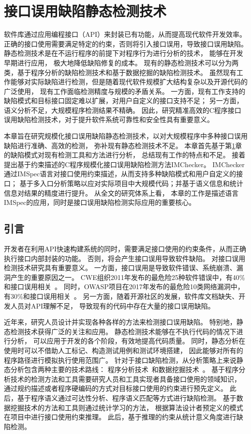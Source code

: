 \chapter{接口误用缺陷静态检测技术}
\label{cha:imchecker}
软件库通过应用编程接口（API）来封装已有功能，从而提高现代软件开发效率。
正确的接口使用需要满足特定的约束，否则将引入接口误用，导致接口误用缺陷。
静态检测技术是在不运行程序的前提下对程序行为进行分析的技术，
能够在开发早期进行应用，
极大地降低缺陷修复的成本。
现有的静态检测技术可以分为两类，基于程序分析的缺陷检测技术和基于数据挖掘的缺陷检测技术。
虽然现有工作能够对实际缺陷进行检测，但是随着现代软件规模扩大结构复杂以及开源代码的广泛使用，
现有工作面临检测精度与规模的矛盾关系。
一方面，现有工作支持的缺陷模式和目标接口固定难以扩展，对用户自定义的接口支持不足；
另一方面，语义分析不足，大规模程序检测结果不精确。
因此，研究精准高效的C程序接口误用缺陷检测技术，对于提升软件系统可靠性和安全性具有重要意义。

本章旨在研究规模化接口误用缺陷静态检测技术，以对大规模程序中多种接口误用缺陷进行准确、高效的检测，
弥补现有静态检测技术不足。
本章首先基于第\ref{cha:imchecker}章的缺陷模式对现有检测工具和方法进行分析，
总结现有工作的特点和不足。
接着提出基于约束描述的C程序规模化接口误用缺陷检测方法IMChecker。
IMChecker通过IMSpec语言对接口使用约束描述，从而支持多种缺陷模式和用户自定义的接口；
基于多入口分析策略以应对实际项目中大规模代码；并基于语义信息和统计信息对结果的精度进行提升。
从全文的研究体系上看，
本章的工作是描述语言IMSpec的应用，同时是接口误用缺陷检测实际应用的重要核心。

\section{引言}
开发者在利用API快速构建系统的同时，需要满足接口使用的约束条件，从而正确执行接口内部封装的功能。
否则，将会产生接口误用导致软件缺陷。
对接口误用检测技术研究具有重要意义。
一方面，接口误用是导致软件错误、系统崩溃、漏洞产生的重要原因之一。
CWE组织2011年发布的最危险25种软件错误中，有40\%和接口误用相关~\cite{cwe-top25}。
同时，OWASP项目在2017年发布的最危险10类网络漏洞中，有30\%和接口误用相关~\cite{owasp-top10}。
另一方面，随着开源社区的发展，软件库文档缺失、开发人员对API理解不足，
导致现有的代码中存在大量的接口误用缺陷。

近年来，研究人员设计并实现各种各样的方法来检测接口误用缺陷。
特别地，静态检测技术获得广泛的关注和应用。
静态检测技术能够在不执行代码的情况下进行分析，
可以应用于开发的各个阶段，有效地提高代码质量。
同时，静态分析在使用时可以不借助人工标记、构造测试用例和测试环境搭建，
因此能够对所有的程序路径进行模拟执行使用范围广。
针对于接口缺陷检测，从分析策略上来说静态分析包含两种主要的技术路线：
程序分析技术~\cite{16-saner-evaluation}和数据挖掘技术~\cite{survey18}。
基于程序分析技术的检测方法和工具需要研究人员和工具实现者具备接口使用的领域知识，
通过规约描述或者程序硬编码的方式对目标接口使用的约束进行预先定义。
此后，基于程序语义通过可达性分析、程序语义匹配等方式进行缺陷检测。
基于数据挖掘技术的方法和工具则通过统计学习的方法，
根据算法设计者预定义的模式在项目中进行接口使用约束推理。
此后，基于推理的约束从统计意义角度进行缺陷检测。

